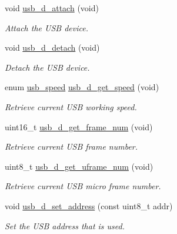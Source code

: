 \begin{DoxyCompactItemize}
\mbox{\label{group__doc__driver__hal__usb__device_ga69ade1f34dfbf55ef65d4f727a861600}} 
void \hyperlink{group__doc__driver__hal__usb__device_ga69ade1f34dfbf55ef65d4f727a861600}{usb\+\_\+d\+\_\+attach} (void)
\begin{DoxyCompactList}\small\item\em Attach the U\+SB device. \end{DoxyCompactList}\item 
\mbox{\label{group__doc__driver__hal__usb__device_ga8db4c58cbd6cc30f52e07c329db74f9f}} 
void \hyperlink{group__doc__driver__hal__usb__device_ga8db4c58cbd6cc30f52e07c329db74f9f}{usb\+\_\+d\+\_\+detach} (void)
\begin{DoxyCompactList}\small\item\em Detach the U\+SB device. \end{DoxyCompactList}\item 
enum \hyperlink{hpl__usb_8h_aa8869b6740b8c54598b0c8aa8bf4d340}{usb\+\_\+speed} \hyperlink{group__doc__driver__hal__usb__device_gaf62023a87e77430dab4553fe213733c0}{usb\+\_\+d\+\_\+get\+\_\+speed} (void)
\begin{DoxyCompactList}\small\item\em Retrieve current U\+SB working speed. \end{DoxyCompactList}\item 
uint16\+\_\+t \hyperlink{group__doc__driver__hal__usb__device_gaec972bc8924fc45ee34da6d4d55b91ff}{usb\+\_\+d\+\_\+get\+\_\+frame\+\_\+num} (void)
\begin{DoxyCompactList}\small\item\em Retrieve current U\+SB frame number. \end{DoxyCompactList}\item 
uint8\+\_\+t \hyperlink{group__doc__driver__hal__usb__device_ga99f3ce0a0dc651174ec3785eb128a062}{usb\+\_\+d\+\_\+get\+\_\+uframe\+\_\+num} (void)
\begin{DoxyCompactList}\small\item\em Retrieve current U\+SB micro frame number. \end{DoxyCompactList}\item 
void \hyperlink{group__doc__driver__hal__usb__device_ga78b6a8341934ab15fe13c731b4134385}{usb\+\_\+d\+\_\+set\+\_\+address} (const uint8\+\_\+t addr)
\begin{DoxyCompactList}\small\item\em Set the U\+SB address that is used. \end{DoxyCompactList}\item 

\end{DoxyCompactItemize}

